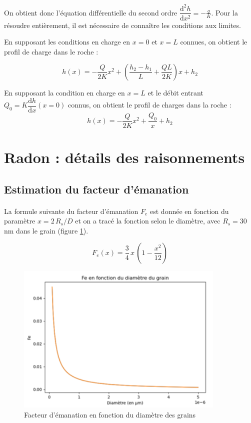 \documentclass{article}
\begin{document}
On obtient donc l’équation différentielle du second ordre $\dfrac{\text{d}^2h}{\text{d}x^2}=-\frac{q}{K}$. 
Pour la résoudre entièrement, il est nécessaire de connaître les conditions aux limites. 

En supposant les conditions en charge en $x = 0$ et $x = L$ connues, on obtient le profil de charge dans le roche :

$$h(x) = -\frac{Q}{2K}x^2 + \left(\frac{h_2 - h_1}{L} + \frac{QL}{2K}\right)x + h_2$$


En supposant la condition en charge en $x = L$ et le débit entrant $Q_0 = K \dfrac{\text{d}h}{\text{d}x}(x = 0)$ connus, on obtient le profil de charges dans la roche :
$$h(x) = -\frac{Q}{2K}x^2 + \frac{Q_0}x + h_2$$

\newpage
\section{Radon : détails des raisonnements}
\label{annexe:detail_modele_radon_sec}
\subsection{Estimation du facteur d'émanation}
\label{annexe:emanation}

\paragraph{} La formule suivante du facteur d'émanation $F_e$ est donnée en fonction du paramètre $x=2\,R_s/D$ et on a tracé la fonction selon le diamètre, avec $R_s=30$ nm dans le grain (figure \ref{fig:facteur_emanation}).

$$
F_e (x)= \frac{3}{4} \,x\,(1- \frac{x^2}{12} )
$$

\begin{figure}[H]
    \centering
    \includegraphics[width=10cm]{II_A2_2.png}
    \caption{Facteur d’émanation en fonction du diamètre des grains}
    \label{fig:facteur_emanation}
\end{figure}
\end{document}
